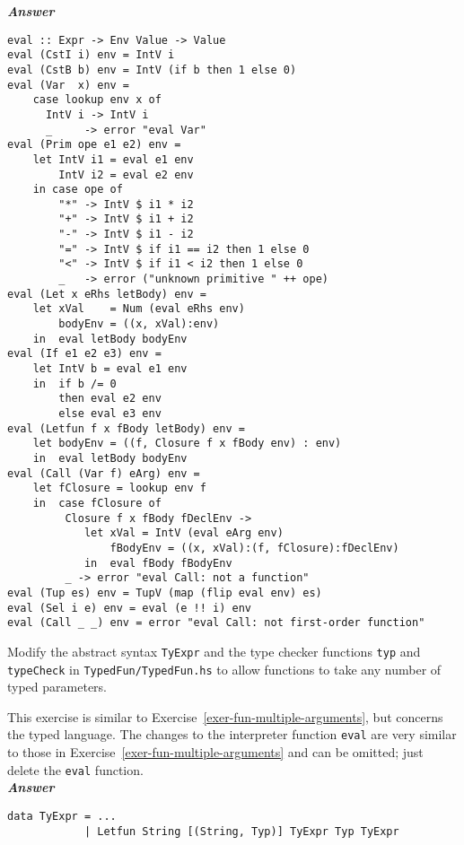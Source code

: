 \documentclass[a4paper]{article}
\begin{document}
\begin{exercise}
\noindent
\textbf{\emph{Answer}} 
{\codesetup\begin{verbatim}
eval :: Expr -> Env Value -> Value
eval (CstI i) env = IntV i 
eval (CstB b) env = IntV (if b then 1 else 0) 
eval (Var  x) env = 
    case lookup env x of 
      IntV i -> IntV i 
      _     -> error "eval Var"
eval (Prim ope e1 e2) env = 
    let IntV i1 = eval e1 env
        IntV i2 = eval e2 env
    in case ope of
        "*" -> IntV $ i1 * i2
        "+" -> IntV $ i1 + i2
        "-" -> IntV $ i1 - i2
        "=" -> IntV $ if i1 == i2 then 1 else 0
        "<" -> IntV $ if i1 < i2 then 1 else 0
        _   -> error ("unknown primitive " ++ ope)
eval (Let x eRhs letBody) env = 
    let xVal    = Num (eval eRhs env)
        bodyEnv = ((x, xVal):env)
    in  eval letBody bodyEnv
eval (If e1 e2 e3) env = 
    let IntV b = eval e1 env
    in  if b /= 0 
        then eval e2 env
        else eval e3 env
eval (Letfun f x fBody letBody) env =
    let bodyEnv = ((f, Closure f x fBody env) : env)
    in  eval letBody bodyEnv
eval (Call (Var f) eArg) env = 
    let fClosure = lookup env f
    in  case fClosure of
         Closure f x fBody fDeclEnv ->
            let xVal = IntV (eval eArg env)
                fBodyEnv = ((x, xVal):(f, fClosure):fDeclEnv)
            in  eval fBody fBodyEnv
         _ -> error "eval Call: not a function"
eval (Tup es) env = TupV (map (flip eval env) es)
eval (Sel i e) env = eval (e !! i) env
eval (Call _ _) env = error "eval Call: not first-order function"

\end{verbatim}}
\end{exercise}


\begin{exercise}\label{exer-fun-multiple-arguments-typed} 
  Modify the abstract syntax \texttt{TyExpr} and the type checker
  functions \texttt{typ} and \texttt{typeCheck} in
  \texttt{TypedFun/TypedFun.hs} to allow functions to take any number
  of typed parameters.  
  
  This exercise is similar to
  Exercise~\ref{exer-fun-multiple-arguments}, but concerns the typed
  language.  The changes to the interpreter function \texttt{eval} are
  very similar to those in Exercise~\ref{exer-fun-multiple-arguments}
  and can be omitted; just delete the \texttt{eval} function.\\
  
  
\noindent
\textbf{\emph{Answer}} 
{\codesetup\begin{verbatim}
data TyExpr = ...
            | Letfun String [(String, Typ)] TyExpr Typ TyExpr
\end{verbatim}}
\end{exercise}
\end{document}

